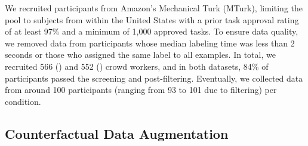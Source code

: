 
We recruited participants from Amazon's Mechanical Turk (MTurk), limiting the pool to subjects from within the United States with a prior task approval rating of at least 97\% and a minimum of 1,000 approved tasks.
To ensure data quality, we removed data from participants whose median labeling time was less than 2 seconds or those who assigned the same label to all examples. 
In total, we recruited 566 (\dbeer) and 552 (\damz) crowd workers, and in both datasets, 84\% of participants passed the screening and post-filtering. 
Eventually, we collected data from around 100 participants (ranging from 93 to 101 due to filtering) per condition.
\subsection{}

\subsection{Counterfactual Data Augmentation}